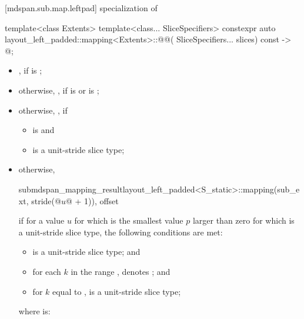 [mdspan.sub.map.leftpad]{ specialization of }

%
\begin{itemdecl}
template<class Extents>
template<class... SliceSpecifiers>
constexpr auto layout_left_padded::mapping<Extents>::@@(
    SliceSpecifiers... slices) const -> @\seebelow@;
\end{itemdecl}

\begin{itemdescr}
\pnum
\returns
\begin{itemize}
\item
{},
if  is ;
\item
otherwise,
,
if  is  or
 is ;
\item
otherwise,
,
if
\begin{itemize}
\item
{} is  and
\item
{} is a unit-stride slice type;
\end{itemize}
\item
otherwise,
\begin{codeblock}
submdspan_mapping_result{layout_left_padded<S_static>::mapping(sub_ext, stride(@$u$@ + 1)),
                         offset}
\end{codeblock}
if for a value $u$
for which  is the smallest value $p$ larger than zero
for which  is a unit-stride slice type,
the following conditions are met:
\begin{itemize}
\item
{} is a unit-stride slice type; and
\item
for each $k$ in the range ,
 denotes ; and
\item
for $k$ equal to ,
 is a unit-stride slice type;
\end{itemize}
where  is:

\end{itemize}
\end{itemdescr}
